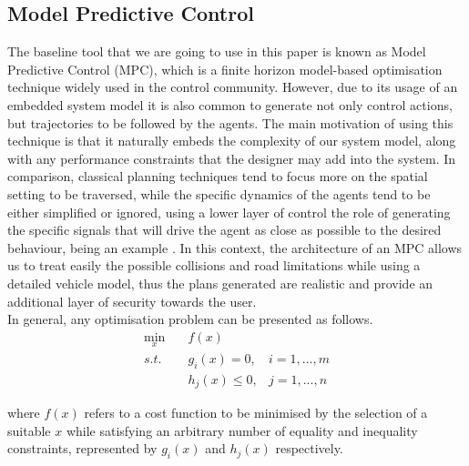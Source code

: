 \documentclass[a4paper,fleqn]{cas-sc}
\begin{document}
\subsection{Model Predictive Control}
The baseline tool that we are going to use in this paper is known as Model Predictive Control (MPC), which is a finite horizon model-based optimisation technique widely used in the control community. However, due to its usage of an embedded system model it is also common to generate not only control actions, but trajectories to be followed by the agents. The main motivation of using this technique is that it naturally embeds the complexity of our system model, along with any performance constraints that the designer may add into the system. In comparison, classical planning techniques tend to focus more on the spatial setting to be traversed, while the specific dynamics of the agents tend to be either simplified or ignored, using a lower layer of control the role of generating the specific signals that will drive the agent as close as possible to the desired behaviour, being an example \cite{AlonsoPuntualModel}. In this context, the architecture of an MPC allows us to treat easily the possible collisions and road limitations while using a detailed vehicle model, thus the plans generated are realistic and provide an additional layer of security towards the user.\\ 

In general, any optimisation problem can be presented as follows.  
\begin{equation}
\begin{aligned}
\min\limits_{x}  &\quad f(x) &\\ 
s.t.             &\quad g_i(x)=0, & i = 1,...,m\\
&\quad h_j(x)\leq0, &j = 1,...,n
\end{aligned}
\end{equation}

where $f(x)$ refers to a cost function to be minimised by the selection of a suitable $x$ while satisfying an arbitrary number of equality and inequality constraints, represented by $g_i(x)$ and $h_j(x)$ respectively.\\
\end{document}

